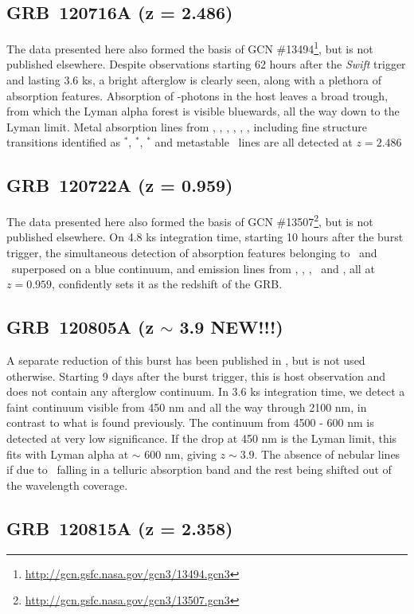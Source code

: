 \documentclass{aa}    %
\begin{document}
\subsection{GRB~120716A (z = 2.486)}
The data presented here also formed the basis of GCN \#13494\footnote{\url{http://gcn.gsfc.nasa.gov/gcn3/13494.gcn3}}, but is not
published elsewhere. Despite observations starting 62 hours after the
\textit{Swift} trigger and lasting 3.6 ks, a bright afterglow is clearly seen,
along with a plethora of absorption features. Absorption of \lya-photons in the
host leaves a broad trough, from which the Lyman alpha forest is visible
bluewards, all the way down to the Lyman limit. Metal absorption lines from
\cii, \SIii, \oi, \feii, \civ, \SIiv, including fine structure transitions
identified as \cii$^*$, \SIii$^*$, \feii$^*$ and metastable \NIii~lines are all
detected at $z = 2.486$


\subsection{GRB~120722A (z = 0.959)}
The data presented here also formed the basis of GCN \#13507\footnote{\url{http://gcn.gsfc.nasa.gov/gcn3/13507.gcn3}}, but is not
published elsewhere. On 4.8 ks integration time, starting 10 hours after the
burst trigger, the simultaneous detection of absorption features belonging to
\mgii~and \feii~superposed on a blue continuum, and emission lines from \oii,
\hg, \hb, \oiii~and \ha, all at $z = 0.959$, confidently sets it as the
redshift of the GRB.



\subsection{GRB~120805A (z $\sim$ 3.9 NEW!!!)}
A separate reduction of this burst has been published in \citet{Kruhler2015},
but is not used otherwise. Starting 9 days after the burst trigger, this is host
observation and does not contain any afterglow continuum. In 3.6 ks integration
time, we detect a faint continuum visible from 450 nm and all the way through
2100 nm, in contrast to what is found previously. The continuum from 4500 -
600 nm is detected at very low significance. If the drop at 450 nm is the
Lyman limit, this fits with Lyman alpha at $\sim$ 600 nm, giving $z \sim
3.9$. The absence of nebular lines if due to \oii~falling in a telluric
absorption band and the rest being shifted out of the wavelength coverage.

\subsection{GRB~120815A (z = 2.358)} 
\end{document}
